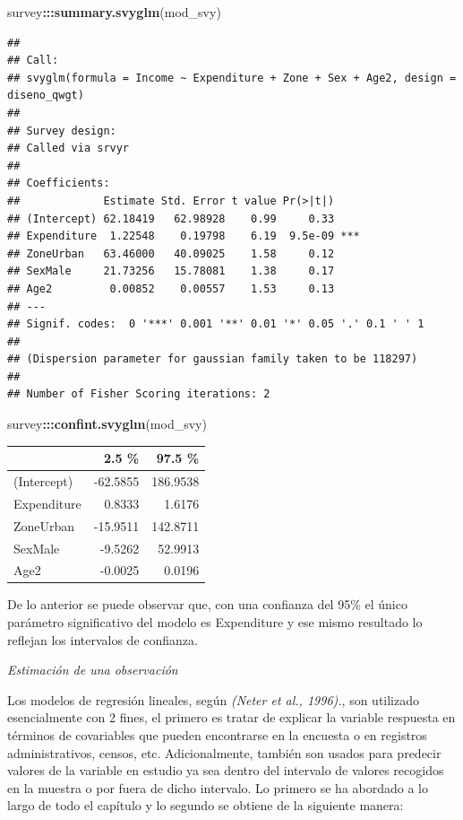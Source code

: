 \documentclass[
  12pt,
]{book}
\newenvironment{Shaded}{\begin{snugshade}}{\end{snugshade}}
\newcommand{\FunctionTok}[1]{\textcolor[rgb]{0.13,0.29,0.53}{\textbf{#1}}}
\newcommand{\NormalTok}[1]{#1}
\newcommand{\SpecialCharTok}[1]{\textcolor[rgb]{0.81,0.36,0.00}{\textbf{#1}}}
\begin{document}
\begin{Shaded}
\begin{Highlighting}[]
\NormalTok{survey}\SpecialCharTok{:::}\FunctionTok{summary.svyglm}\NormalTok{(mod\_svy)}
\end{Highlighting}
\end{Shaded}

\begin{verbatim}
## 
## Call:
## svyglm(formula = Income ~ Expenditure + Zone + Sex + Age2, design = diseno_qwgt)
## 
## Survey design:
## Called via srvyr
## 
## Coefficients:
##             Estimate Std. Error t value Pr(>|t|)    
## (Intercept) 62.18419   62.98928    0.99     0.33    
## Expenditure  1.22548    0.19798    6.19  9.5e-09 ***
## ZoneUrban   63.46000   40.09025    1.58     0.12    
## SexMale     21.73256   15.78081    1.38     0.17    
## Age2         0.00852    0.00557    1.53     0.13    
## ---
## Signif. codes:  0 '***' 0.001 '**' 0.01 '*' 0.05 '.' 0.1 ' ' 1
## 
## (Dispersion parameter for gaussian family taken to be 118297)
## 
## Number of Fisher Scoring iterations: 2
\end{verbatim}

\begin{Shaded}
\begin{Highlighting}[]
\NormalTok{survey}\SpecialCharTok{:::}\FunctionTok{confint.svyglm}\NormalTok{(mod\_svy)}
\end{Highlighting}
\end{Shaded}

\begin{tabular}{l|r|r}
\hline
  & 2.5 \% & 97.5 \%\\
\hline
(Intercept) & -62.5855 & 186.9538\\
\hline
Expenditure & 0.8333 & 1.6176\\
\hline
ZoneUrban & -15.9511 & 142.8711\\
\hline
SexMale & -9.5262 & 52.9913\\
\hline
Age2 & -0.0025 & 0.0196\\
\hline
\end{tabular}

De lo anterior se puede observar que, con una confianza del 95\% el único parámetro significativo del modelo es Expenditure y ese mismo resultado lo reflejan los intervalos de confianza.

\emph{Estimación de una observación}

Los modelos de regresión lineales, según \emph{(Neter et al., 1996).}, son utilizado esencialmente con 2 fines, el primero es tratar de explicar la variable respuesta en términos de covariables que pueden encontrarse en la encuesta o en registros administrativos, censos, etc. Adicionalmente, también son usados para predecir valores de la variable en estudio ya sea dentro del intervalo de valores recogidos en la muestra o por fuera de dicho intervalo. Lo primero se ha abordado a lo largo de todo el capítulo y lo segundo se obtiene de la siguiente manera:
\end{document}
